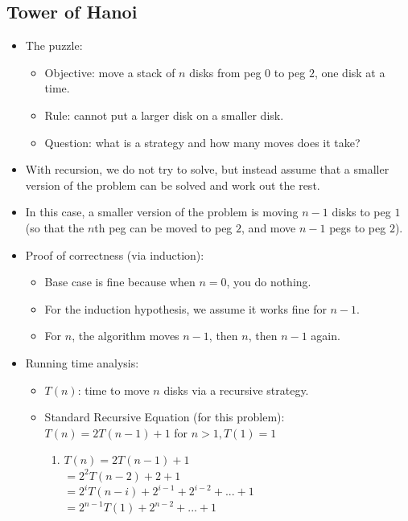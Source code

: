 \subsection{Tower of Hanoi}
\begin{itemize}
    \item The puzzle:
    \begin{itemize}
        \item Objective: move a stack of $n$ disks from peg $0$ to peg $2$, one disk at a time.
        \item Rule: cannot put a larger disk on a smaller disk.
        \item Question: what is a strategy and how many moves does it take?
    \end{itemize}
    \item With recursion, we do not try to solve, but instead assume that a smaller version of the problem can be solved and work out the rest.
    \item In this case, a smaller version of the problem is moving $n-1$ disks to peg $1$ (so that the $n$th peg can be moved to peg $2$, and move $n-1$ pegs to peg $2$).
    
    \item Proof of correctness (via induction):
    \begin{itemize}
        \item Base case is fine because when $n = 0$, you do nothing.
        \item For the induction hypothesis, we assume it works fine for $n - 1$.
        \item For $n$, the algorithm moves $n - 1$, then $n$, then $n - 1$ again.
    \end{itemize}
    \item Running time analysis:
    \begin{itemize}
        \item $T(n)$: time to move $n$ disks via a recursive strategy.
        \item Standard Recursive Equation (for this problem): $T(n) = 2T(n - 1) + 1$ for $n > 1, T(1) = 1$
        \begin{enumerate}
            \item
                $T(n) = 2T(n - 1) + 1$ \\
                $= 2^2 T(n - 2) + 2 + 1$ \\
                $= 2^i T(n - i) + 2^{i-1} + 2^{i-2} + ... + 1$ \\
                $= 2^{n-1} T(1) + 2^{n-2} + ... + 1$ \\

\end{enumerate}
\end{itemize}
\end{itemize}
